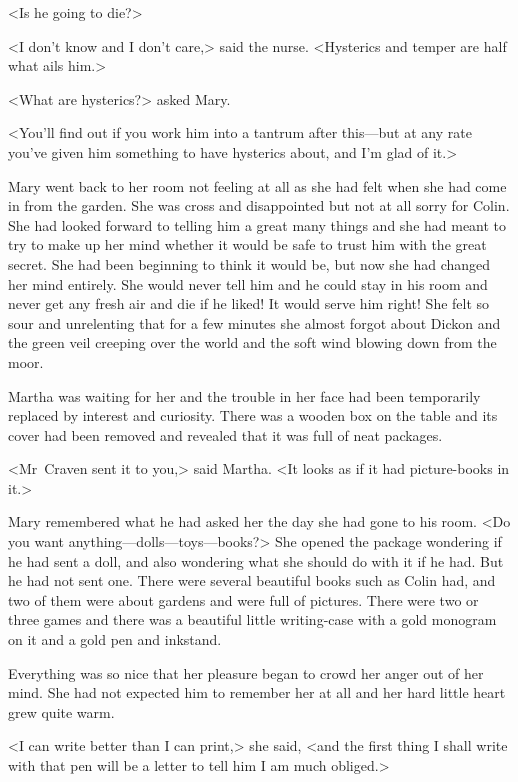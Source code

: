 <Is he going to die?>

<I don't know and I don't care,> said the nurse. <Hysterics and temper are half what ails him.>

<What are hysterics?> asked Mary.

<You'll find out if you work him into a tantrum after this—but at any rate you've given him something to have hysterics about, and I'm glad of it.>

Mary went back to her room not feeling at all as she had felt when she had come in from the garden. She was cross and disappointed but not at all sorry for Colin. She had looked forward to telling him a great many things and she had meant to try to make up her mind whether it would be safe to trust him with the great secret. She had been beginning to think it would be, but now she had changed her mind entirely. She would never tell him and he could stay in his room and never get any fresh air and die if he liked! It would serve him right! She felt so sour and unrelenting that for a few minutes she almost forgot about Dickon and the green veil creeping over the world and the soft wind blowing down from the moor.

Martha was waiting for her and the trouble in her face had been temporarily replaced by interest and curiosity. There was a wooden box on the table and its cover had been removed and revealed that it was full of neat packages.

<Mr~Craven sent it to you,> said Martha. <It looks as if it had picture-books in it.>

Mary remembered what he had asked her the day she had gone to his room. <Do you want anything—dolls—toys—books?> She opened the package wondering if he had sent a doll, and also wondering what she should do with it if he had. But he had not sent one. There were several beautiful books such as Colin had, and two of them were about gardens and were full of pictures. There were two or three games and there was a beautiful little writing-case with a gold monogram on it and a gold pen and inkstand.

Everything was so nice that her pleasure began to crowd her anger out of her mind. She had not expected him to remember her at all and her hard little heart grew quite warm.

<I can write better than I can print,> she said, <and the first thing I shall write with that pen will be a letter to tell him I am much obliged.>

